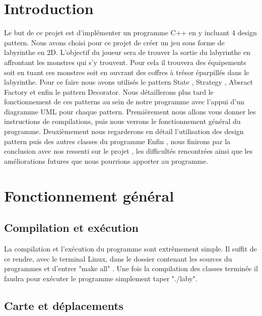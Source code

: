 \documentclass[a4paper]{article}
\author{\docsauthor}
\title{\docstitle}
\date{\today}
\begin{document}
	\maketitle{}
	\thispagestyle{empty}
	\newpage
	\tableofcontents{}
	\newpage
	\section{Introduction}

Le but de ce projet est d’implémenter un programme C++ en y incluant 4 design pattern.
Nous avons choisi pour ce projet de créer un jeu sous forme de labyrinthe en 2D. L'objectif du joueur sera
de trouver la sortie du labyrinthe en affrontant les monstres qui s'y trouvent. Pour cela il trouvera des équipements soit
en tuant ces monstres soit en ouvrant des coffres à trésor éparpillés dans le labyrinthe.
Pour ce faire nous avons utilisés le pattern State , Strategy , Absract Factory et enfin le pattern Decorator. Nous détaillerons plus tard
le fonctionnement de ces patterns au sein de notre programme avec l'appui d'un diagramme UML pour chaque pattern.
Premièrement nous allons vous donner les instructions de compilations, puis nous verrons le fonctionnement général du programme.
Deuxièmement nous regarderons en détail l'utilisation des design pattern puis des autres classes du programme
Enfin , nous finirons par la conclusion avec nos ressenti sur le projet , les difficultés rencontrées ainsi que les améliorations futures
que nous pourrions apporter au programme.


	\section{Fonctionnement général}

    \subsection{Compilation et exécution}
        
 La compilation et l’exécution du programme sont extrêmement simple. Il suffit de ce rendre, avec le terminal Linux, dans le dossier contenant
 les sources du programmes et d'entrer "make all" .
 Une fois la compilation des classes terminée il faudra pour exécuter le programme simplement taper "./laby".
 
    \subsection{Carte et déplacements}
    
\end{document}
